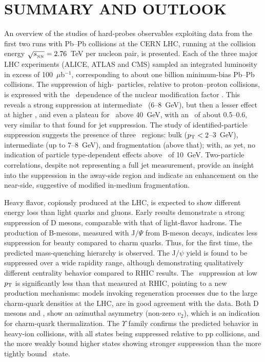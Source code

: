 \section{SUMMARY AND OUTLOOK}
\label{summary}
 An overview of the studies of hard-probes observables exploiting data from the first two runs with Pb--Pb collisions at the CERN LHC, running at the collision energy $\sqrt{s_{_{\rm NN}}} = 2.76$~TeV per nucleon pair, is presented. Each of the three major LHC experiments (ALICE, ATLAS and CMS) sampled an integrated luminosity in excess of 100~$\mu$b$^{-1}$, corresponding to about one billion minimum-bias Pb--Pb collisions. The suppression of high-\pT\ particles, relative to proton--proton collisions, is expressed with the \pt\ dependence of the nuclear modification factor \Raa. This reveals a strong suppression at intermediate \pT\ (6--8~GeV), but then a lesser effect at higher \pt, and even a plateau for \pt\ above 40~GeV, with an \Raa\ of about 0.5--0.6, very similar to that found for jet suppression. The study of identified-particle suppression suggests the presence of three \pt\ regions: bulk ($\mbox{$p_{\mathrm{T}}$} < 2$--$3$~GeV), intermediate (up to 7--8~GeV), and fragmentation (above that); with, as yet, no indication of particle type-dependent effects above \pt\ of 10~GeV. Two-particle correlations, despite not representing a full jet measurement, provide an insight into the suppression in the away-side region and indicate an enhancement on the near-side,
suggestive of modified in-medium fragmentation.

Heavy flavor, copiously produced at the LHC, is expected to show different energy loss than light quarks and gluons. Early results demonstrate a strong suppression of D mesons, comparable with that of light-flavor hadrons. The  production of B-mesons, measured with J$/\Psi$ from B-meson decays, indicates less suppression for beauty compared to charm quarks. Thus, for the first time, the predicted mass-quenching hierarchy is observed. The J$/\psi$ yield is found to be suppressed over a wide rapidity range, although demonstrating qualitatively different centrality behavior compared to RHIC results. The \Jpsi\ suppression at low $\mbox{$p_{\mathrm{T}}$}$ is significantly less than that measured at RHIC, pointing to a new production mechanisms: models invoking regeneration processes due to the large charm-quark densities at the LHC, are in good agreement with the data. Both D mesons and \Jpsi, show an azimuthal asymmetry (non-zero $v_2$), which is an indication for charm-quark thermalization. The $\Upsilon$ family confirms the predicted behavior in heavy-ion collisions, with all states being suppressed relative to pp collisions, and the more weakly bound higher states showing stronger suppression than the more tightly bound \PgUa\ state.

